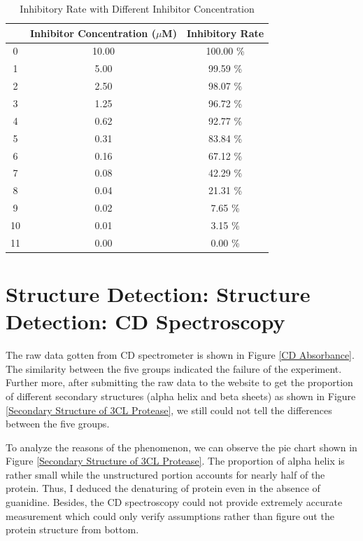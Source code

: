 \documentclass{report}
\begin{document}
\begin{table}
    \centering
    \caption{Inhibitory Rate with Different Inhibitor Concentration}

    \begin{tabular}{|c|c|c|}
        \toprule
         & Inhibitor Concentration ($\mu$M) & Inhibitory Rate \\
        \midrule
        0 & 10.00 & 100.00 \% \\
        1 & 5.00 & 99.59 \% \\
        2 & 2.50 & 98.07 \% \\
        3 & 1.25 & 96.72 \% \\
        4 & 0.62 & 92.77 \% \\
        5 & 0.31 & 83.84 \% \\
        6 & 0.16 & 67.12 \% \\
        7 & 0.08 & 42.29 \% \\
        8 & 0.04 & 21.31 \% \\
        9 & 0.02 & 7.65 \% \\
        10 & 0.01 & 3.15 \% \\
        11 & 0.00 & 0.00 \% \\
        \bottomrule
        \end{tabular}
    \label{Inhibitory Rate with Different Inhibitor Concentration}            
        
\end{table}


\section{Structure Detection: Structure Detection: CD Spectroscopy}
The raw data gotten from CD spectrometer is shown in Figure \ref{CD Absorbance}.
The similarity between the five groups indicated the failure of the experiment.
Further more, after submitting the raw data to the website\cite{bestsel} to get the proportion of different secondary structures (alpha helix and beta sheets) as shown in Figure \ref{Secondary Structure of 3CL Protease}, we still could not tell the differences between the five groups.

To analyze the reasons of the phenomenon, we can observe the pie chart shown in Figure \ref{Secondary Structure of 3CL Protease}.
The proportion of alpha helix is rather small while the unstructured portion accounts for nearly half of the protein.
Thus, I deduced the denaturing of protein even in the absence of guanidine.
Besides, the CD spectroscopy could not provide extremely accurate measurement which could only verify assumptions rather than figure out the protein structure from bottom.
\end{document}

